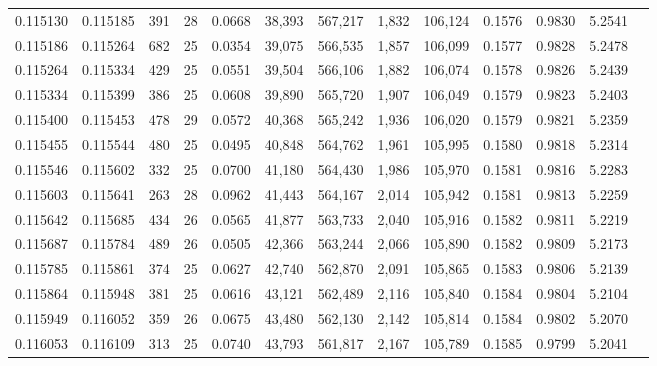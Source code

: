 \begin{tabular}{rrrrrrrrrrrrr}
0.115130 & 0.115185 & 391 &  28 &                                     0.0668 &  38,393 & 567,217 &   1,832 & 106,124 & 0.1576 & 0.9830 & 5.2541 \\
0.115186 & 0.115264 & 682 &  25 &                                     0.0354 &  39,075 & 566,535 &   1,857 & 106,099 & 0.1577 & 0.9828 & 5.2478 \\
0.115264 & 0.115334 & 429 &  25 &                                     0.0551 &  39,504 & 566,106 &   1,882 & 106,074 & 0.1578 & 0.9826 & 5.2439 \\
0.115334 & 0.115399 & 386 &  25 &                                     0.0608 &  39,890 & 565,720 &   1,907 & 106,049 & 0.1579 & 0.9823 & 5.2403 \\
0.115400 & 0.115453 & 478 &  29 &                                     0.0572 &  40,368 & 565,242 &   1,936 & 106,020 & 0.1579 & 0.9821 & 5.2359 \\
0.115455 & 0.115544 & 480 &  25 &                                     0.0495 &  40,848 & 564,762 &   1,961 & 105,995 & 0.1580 & 0.9818 & 5.2314 \\
0.115546 & 0.115602 & 332 &  25 &                                     0.0700 &  41,180 & 564,430 &   1,986 & 105,970 & 0.1581 & 0.9816 & 5.2283 \\
0.115603 & 0.115641 & 263 &  28 &                                     0.0962 &  41,443 & 564,167 &   2,014 & 105,942 & 0.1581 & 0.9813 & 5.2259 \\
0.115642 & 0.115685 & 434 &  26 &                                     0.0565 &  41,877 & 563,733 &   2,040 & 105,916 & 0.1582 & 0.9811 & 5.2219 \\
0.115687 & 0.115784 & 489 &  26 &                                     0.0505 &  42,366 & 563,244 &   2,066 & 105,890 & 0.1582 & 0.9809 & 5.2173 \\
0.115785 & 0.115861 & 374 &  25 &                                     0.0627 &  42,740 & 562,870 &   2,091 & 105,865 & 0.1583 & 0.9806 & 5.2139 \\
0.115864 & 0.115948 & 381 &  25 &                                     0.0616 &  43,121 & 562,489 &   2,116 & 105,840 & 0.1584 & 0.9804 & 5.2104 \\
0.115949 & 0.116052 & 359 &  26 &                                     0.0675 &  43,480 & 562,130 &   2,142 & 105,814 & 0.1584 & 0.9802 & 5.2070 \\
0.116053 & 0.116109 & 313 &  25 &                                     0.0740 &  43,793 & 561,817 &   2,167 & 105,789 & 0.1585 & 0.9799 & 5.2041 \\

\end{tabular}
